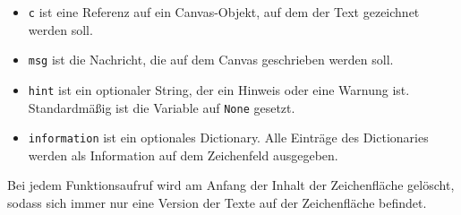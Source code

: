 \documentclass[11pt]{article}
\providecommand{\tightlist}{%
      \setlength{\itemsep}{0pt}\setlength{\parskip}{0pt}}
\begin{document}
\begin{itemize}
\tightlist
\item
  \texttt{c} ist eine Referenz auf ein Canvas-Objekt, auf dem der Text
  gezeichnet werden soll.
\item
  \texttt{msg} ist die Nachricht, die auf dem Canvas geschrieben werden
  soll.
\item
  \texttt{hint} ist ein optionaler String, der ein Hinweis oder eine
  Warnung ist. Standardmäßig ist die Variable auf \texttt{None} gesetzt.
\item
  \texttt{information} ist ein optionales Dictionary. Alle Einträge des
  Dictionaries werden als Information auf dem Zeichenfeld ausgegeben.
\end{itemize}

Bei jedem Funktionsaufruf wird am Anfang der Inhalt der Zeichenfläche
gelöscht, sodass sich immer nur eine Version der Texte auf der
Zeichenfläche befindet.
\end{document}
